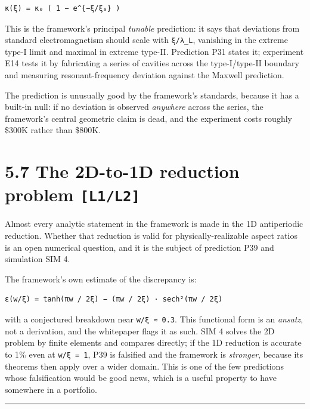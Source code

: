 \documentclass[
  11pt]{report}
\begin{document}
\begin{verbatim}
κ(ξ) = κ₀ ( 1 − e^{−ξ/ξ₀} )
\end{verbatim}

This is the framework's principal \emph{tunable} prediction: it says
that deviations from standard electromagnetism should scale with
\texttt{ξ/λ\_L}, vanishing in the extreme type-I limit and maximal in
extreme type-II. Prediction P31 states it; experiment E14 tests it by
fabricating a series of cavities across the type-I/type-II boundary and
measuring resonant-frequency deviation against the Maxwell prediction.

The prediction is unusually good by the framework's standards, because
it has a built-in null: if no deviation is observed \emph{anywhere}
across the series, the framework's central geometric claim is dead, and
the experiment costs roughly \$300K rather than \$800K.

\hypertarget{the-2d-to-1d-reduction-problem-l1l2}{%
\section{\texorpdfstring{5.7 The 2D-to-1D reduction problem
\texttt{{[}L1/L2{]}}}{5.7 The 2D-to-1D reduction problem {[}L1/L2{]}}}\label{the-2d-to-1d-reduction-problem-l1l2}}

Almost every analytic statement in the framework is made in the 1D
antiperiodic reduction. Whether that reduction is valid for
physically-realizable aspect ratios is an open numerical question, and
it is the subject of prediction P39 and simulation SIM 4.

The framework's own estimate of the discrepancy is:

\begin{verbatim}
ε(w/ξ) = tanh(πw / 2ξ) − (πw / 2ξ) · sech²(πw / 2ξ)
\end{verbatim}

with a conjectured breakdown near \texttt{w/ξ\ ≈\ 0.3}. This functional
form is an \emph{ansatz}, not a derivation, and the whitepaper flags it
as such. SIM 4 solves the 2D problem by finite elements and compares
directly; if the 1D reduction is accurate to 1\% even at
\texttt{w/ξ\ =\ 1}, P39 is falsified and the framework is
\emph{stronger}, because its theorems then apply over a wider domain.
This is one of the few predictions whose falsification would be good
news, which is a useful property to have somewhere in a portfolio.

\begin{center}\rule{0.5\linewidth}{0.5pt}\end{center}
\end{document}
